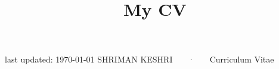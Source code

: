 \documentclass[11pt, letterpaper, draft]{academic-cv}
\title{My CV}
\begin{document}
\makecvheader

\makecvfooter
  {last updated: \today}
  {SHRIMAN KESHRI ~~~·~~~ Curriculum Vitae}
  {\thepage}










\newpage











% 
% 
% 
% 
% 
% 

\end{document}
